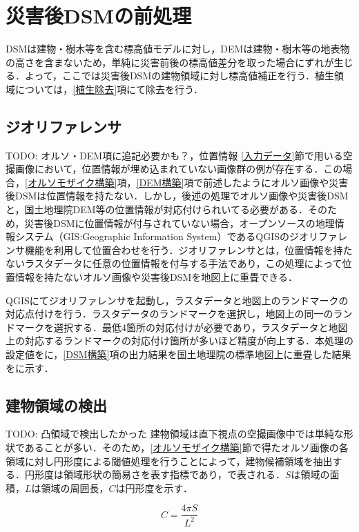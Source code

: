   \section{災害後DSMの前処理}
    DSMは建物・樹木等を含む標高値モデルに対し，DEMは建物・樹木等の地表物の高さを含まないため，単純に災害前後の標高値差分を取った場合にずれが生じる．よって，ここでは災害後DSMの建物領域に対し標高値補正を行う．植生領域については，\ref{植生除去}項にて除去を行う．

    \subsection{ジオリファレンサ}
    TODO: オルソ・DEM項に追記必要かも？，位置情報
      \ref{入力データ}節で用いる空撮画像において，位置情報が埋め込まれていない画像群の例が存在する．この場合，\ref{オルソモザイク構築}項，\ref{DEM構築}項で前述したようにオルソ画像や災害後DSMは位置情報を持たない．しかし，後述の処理でオルソ画像や災害後DSMと，国土地理院DEM等の位置情報が対応付けられいてる必要がある．そのため，災害後DSMに位置情報が付与されていない場合，オープンソースの地理情報システム（GIS:Geographic Information System）であるQGIS\cite{QGIS}のジオリファレンサ機能を利用して位置合わせを行う．ジオリファレンサとは，位置情報を持たないラスタデータに任意の位置情報を付与する手法であり，この処理によって位置情報を持たないオルソ画像や災害後DSMを地図上に重畳できる．
      
      QGISにてジオリファレンサを起動し，ラスタデータと地図上のランドマークの対応点付けを行う．ラスタデータのランドマークを選択し，地図上の同一のランドマークを選択する．最低4箇所の対応付けが必要であり，ラスタデータと地図上の対応するランドマークの対応付け箇所が多いほど精度が向上する．本処理の設定値を\fref{}に，\ref{DSM構築}項の出力結果を国土地理院の標準地図\cite{標準地図}上に重畳した結果を\fref{}に示す．

    \subsection{建物領域の検出}
      \label{建物領域の検出}
      TODO: 凸領域で検出したかった
      建物領域は直下視点の空撮画像中では単純な形状であることが多い．そのため，\ref{オルソモザイク構築}節で得たオルソ画像の各領域に対し円形度による閾値処理を行うことによって，建物候補領域を抽出する．円形度は領域形状の簡易さを表す指標であり，で表される．$S$は領域の面積，$L$は領域の周囲長，$C$は円形度を示す．

      \begin{equation}
        \label{円形度}
        C = \dfrac{4 \pi S} {L^2} 
      \end{equation}

